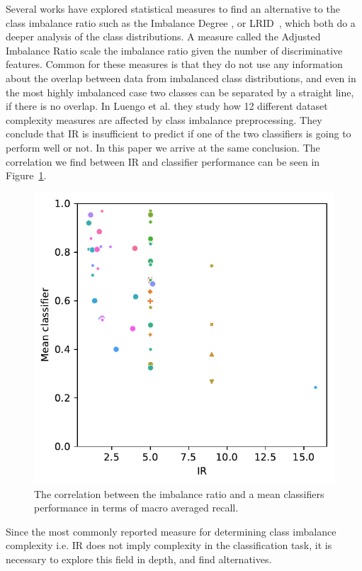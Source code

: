\documentclass[twoside,leqno,twocolumn]{article}
\begin{document}
Several works have explored statistical measures to find an alternative to the class imbalance ratio such as the Imbalance Degree \cite{DBLP:journals/prl/Ortigosa-Hernandez17}, or LRID~\cite{DBLP:journals/prl/ZhuWMWX18}, which both do a deeper analysis of the class distributions. A measure called the Adjusted Imbalance Ratio \cite{DBLP:journals/prl/ZhuGX20} scale the imbalance ratio given the number of discriminative features. Common for these measures is that they do not use any information about the overlap between data from imbalanced class distributions, and even in the most highly imbalanced case two classes can be separated by a straight line, if there is no overlap. In Luengo et al. \cite{luengo2011addressing} they study how 12 different dataset complexity measures are affected by class imbalance preprocessing. They conclude that IR is insufficient to predict if one of the two classifiers is going to perform well or not. In this paper we arrive at the same conclusion. The correlation we find between IR and classifier performance can be seen in Figure~\ref{fig:ir_dataset_plot}.
\begin{figure}[tbp]
\centering
\includegraphics[width=0.9\columnwidth]{plots/dataset_plots/siam_full_plot_IR.pdf}
\caption{The correlation between the imbalance ratio and a mean classifiers performance in terms of macro averaged recall.}
\label{fig:ir_dataset_plot}
\end{figure}
Since the most commonly reported measure for determining class imbalance complexity i.e. IR does not imply complexity in the classification task, it is necessary to explore this field in depth, and find alternatives. 
\end{document}
